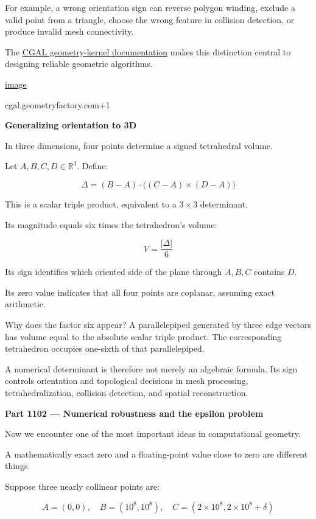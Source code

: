 For example, a wrong orientation sign can reverse polygon winding, exclude a valid point from a triangle, choose the wrong feature in collision detection, or produce invalid mesh connectivity.

The \href{https://cgal.geometryfactory.com/CGAL/doc/main/Kernel_23/index.html?utm_source=chatgpt.com}{CGAL geometry-kernel documentation} makes this distinction central to designing reliable geometric algorithms. 

\href{https://www.google.com/s2/favicons?domain=https://cgal.geometryfactory.com&sz=32}{image}

cgal.geometryfactory.com+1

\textbf{Generalizing orientation to 3D}

In three dimensions, four points determine a signed tetrahedral volume.

Let \(A,B,C,D\in\mathbb{R}^3\). Define:

\[
\Delta = (B-A)\cdot\big((C-A)\times(D-A)\big)
\]

This is a scalar triple product, equivalent to a \(3\times3\) determinant.

Its magnitude equals six times the tetrahedron's volume:

\[
V=\frac{|\Delta|}{6}
\]

Its sign identifies which oriented side of the plane through \(A,B,C\) contains \(D\).

Its zero value indicates that all four points are coplanar, assuming exact arithmetic.

Why does the factor six appear? A parallelepiped generated by three edge vectors has volume equal to the absolute scalar triple product. The corresponding tetrahedron occupies one-sixth of that parallelepiped.

A numerical determinant is therefore not merely an algebraic formula. Its sign controls orientation and topological decisions in mesh processing, tetrahedralization, collision detection, and spatial reconstruction.

\textbf{Part 1102 --- Numerical robustness and the epsilon problem}

Now we encounter one of the most important ideas in computational geometry.

A mathematically exact zero and a floating-point value close to zero are different things.

Suppose three nearly collinear points are:

\[
A=(0,0),\quad B=(10^8,10^8),\quad C=(2\times10^8,2\times10^8+\delta)
\]

